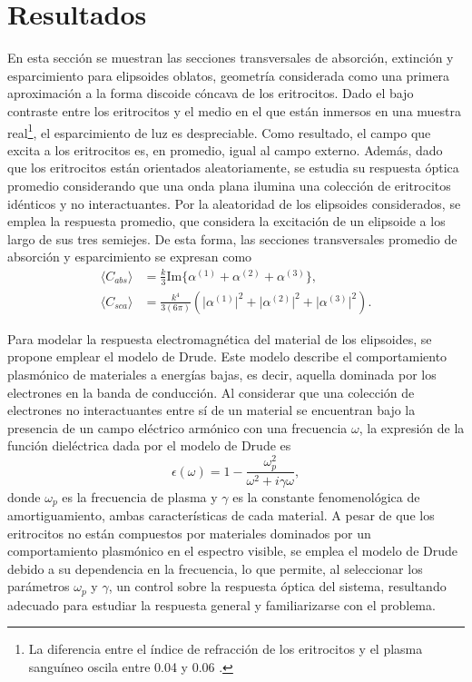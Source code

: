 	\hypertarget{resultados}{\section{Resultados}}
En esta sección se muestran las secciones transversales de absorción, extinción y esparcimiento para elipsoides oblatos, geometría considerada como una primera aproximación a la forma discoide cóncava de los eritrocitos. Dado el bajo contraste entre los eritrocitos y el medio en el que están inmersos en una muestra real\footnote{La diferencia entre el índice de refracción de los eritrocitos y el plasma sanguíneo oscila entre 0.04 y 0.06 \cite{Blood}.}, el esparcimiento de luz es despreciable. Como resultado, el campo que excita a los eritrocitos es, en promedio, igual al campo externo. Además, dado que los eritrocitos están orientados aleatoriamente, se estudia su respuesta óptica promedio considerando que una onda plana ilumina una colección de eritrocitos idénticos y no interactuantes. Por la aleatoridad de los elipsoides considerados, se emplea la respuesta promedio, que considera la excitación de un elipsoide a los largo de sus tres semiejes. De esta forma, las secciones transversales promedio de absorción y esparcimiento se expresan como \cite{Bohren}
\begin{align*}
	\langle C_{abs}\rangle &= \frac{k}{3} \text{Im}\{\alpha^{(1)}+\alpha^{(2)}+\alpha^{(3)}\},\\
	\langle C_{sca}\rangle &= \frac{k^4}{3(6\pi)} \left(\big|\alpha^{(1)}\big|^2+\big|\alpha^{(2)}\big|^2+\big|\alpha^{(3)}\big|^2\right).
\end{align*}

Para modelar la respuesta electromagnética del material de los elipsoides, se propone emplear el modelo de Drude. Este modelo describe el comportamiento plasmónico de materiales a energías bajas, es decir, aquella dominada por los electrones en la banda de conducción. Al considerar que una colección de electrones no interactuantes entre sí de un material se encuentran bajo la presencia de un campo eléctrico armónico con una frecuencia $\omega$, la expresión de la función dieléctrica dada por el modelo de Drude es \cite{Plasmonics}
\begin{equation} \epsilon(\omega) = 1 - \frac{\omega_p^2}{\omega^2 + i\gamma\omega}, 
\label{Drude}
\end{equation}
donde $\omega_p$ es la frecuencia de plasma y $\gamma$ es la constante fenomenológica de amortiguamiento, ambas características de cada material. A pesar de  que los eritrocitos no están compuestos por materiales dominados por un comportamiento plasmónico en el espectro visible, se emplea el modelo de Drude debido a su dependencia en la frecuencia, lo que permite, al seleccionar los parámetros $\omega_p$ y $\gamma$, un control sobre la respuesta óptica del sistema, resultando adecuado para estudiar la respuesta general y familiarizarse con el problema.\\

